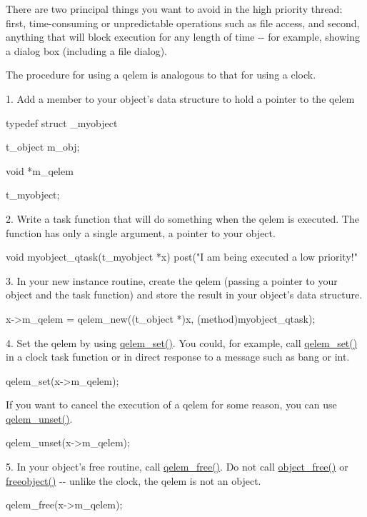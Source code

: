 There are two principal things you want to avoid in the high priority thread: first, time-\/consuming or unpredictable operations such as file access, and second, anything that will block execution for any length of time -\/-\/ for example, showing a dialog box (including a file dialog).

The procedure for using a qelem is analogous to that for using a clock.

1. Add a member to your object's data structure to hold a pointer to the qelem 
\begin{DoxyCode}
    typedef struct _myobject
    {
        t_object m_obj;
    
        void *m_qelem
    } t_myobject;
\end{DoxyCode}


2. Write a task function that will do something when the qelem is executed. The function has only a single argument, a pointer to your object. 
\begin{DoxyCode}
    void myobject_qtask(t_myobject *x)
    {
        post("I am being executed a low priority!"
    }
\end{DoxyCode}


3. In your new instance routine, create the qelem (passing a pointer to your object and the task function) and store the result in your object's data structure. 
\begin{DoxyCode}
        x->m_qelem = qelem_new((t_object *)x, (method)myobject_qtask);
\end{DoxyCode}


4. Set the qelem by using \hyperlink{group__qelems_ga3e292aad133af89a87e167e88cc4a1b5}{qelem\_\-set()}. You could, for example, call \hyperlink{group__qelems_ga3e292aad133af89a87e167e88cc4a1b5}{qelem\_\-set()} in a clock task function or in direct response to a message such as bang or int. 
\begin{DoxyCode}
        qelem_set(x->m_qelem);
\end{DoxyCode}


If you want to cancel the execution of a qelem for some reason, you can use \hyperlink{group__qelems_ga021eca2eff6e47ff97ca112fb2eaf866}{qelem\_\-unset()}. 
\begin{DoxyCode}
        qelem_unset(x->m_qelem);
\end{DoxyCode}


5. In your object's free routine, call \hyperlink{group__qelems_ga7cfcb3134eb0baf335847906a14a08d0}{qelem\_\-free()}. Do not call \hyperlink{group__obj_ga3759846cb356195532c41e35b87522ee}{object\_\-free()} or \hyperlink{group__class__old_gadf30646e52376a37b93cc20efac65636}{freeobject()} -\/-\/ unlike the clock, the qelem is not an object. 
\begin{DoxyCode}
        qelem_free(x->m_qelem);
\end{DoxyCode}



